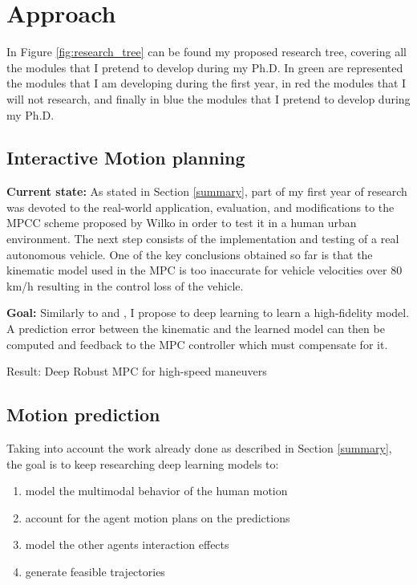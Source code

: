 \section{Approach} \label{approach}
In Figure \ref{fig:research_tree} can be found my proposed research tree, covering all the modules that I pretend to develop during my Ph.D. In green are represented the modules that I am developing during the first year, in red the modules that I will not research, and finally in blue the modules that I pretend to develop during my Ph.D.

\subsection{Interactive Motion planning}

\textbf{Current state:}
As stated in Section \ref{summary}, part of my first year of research was devoted to the real-world application, evaluation, and modifications to the MPCC scheme proposed by Wilko \cite{Schwarting2017} in order to test it in a human urban environment. The next step consists of the implementation and testing of a real autonomous vehicle. One of the key conclusions obtained so far is that the kinematic model used in the MPC is too inaccurate for vehicle velocities over 80 km/h resulting in the control loss of the vehicle. 

\textbf{Goal:}
Similarly to \cite{Lenz2015} and \cite{rl-nmpc}, I propose to deep learning to learn a high-fidelity model. A prediction error between the kinematic and the learned model can then be computed and feedback to the MPC controller which must compensate for it.

Result: Deep Robust MPC for high-speed maneuvers

\subsection{Motion prediction}
Taking into account the work already done as described in Section \ref{summary}, the goal is to keep researching deep learning models to:

\begin{enumerate}
\item model the multimodal behavior of the human motion
\item account for the agent motion plans on the predictions
\item model the other agents interaction effects
\item generate feasible trajectories
\end{enumerate}

